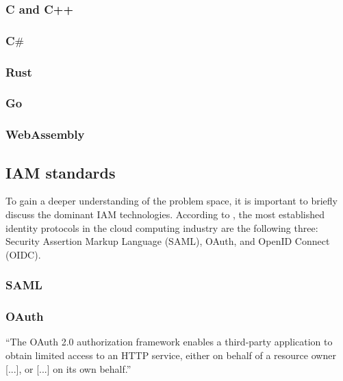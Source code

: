 \subsubsection{C and C++}

\subsubsection{C$\#$}

\subsubsection{Rust}

\subsubsection{Go}

\subsubsection{WebAssembly}

\subsection{IAM standards}
To gain a deeper understanding of the problem space, it is important to briefly discuss the dominant IAM technologies. According to \textcite{Naik2016}, the most established identity protocols in the cloud computing industry are the following three: Security Assertion Markup Language (SAML), OAuth, and OpenID Connect (OIDC). 

\subsubsection{SAML}

\subsubsection{OAuth}


``The OAuth 2.0 authorization framework enables a third-party
application to obtain limited access to an HTTP service, either on
behalf of a resource owner [...], or [...] on its own behalf.'' \autocite{Hardt2023}


